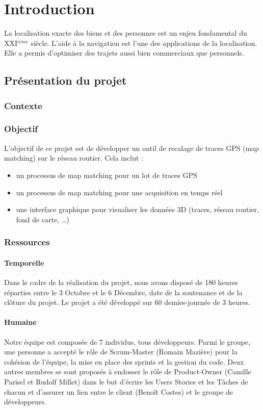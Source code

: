 \chapter{Introduction}
La localisation exacte des biens et des personnes est un enjeu fondamental du XXI$^{ieme}$ siècle. L'aide à la navigation est l'une des applications de la localisation. Elle a permis d'optimiser des trajets aussi bien commerciaux que personnels.
\section{Présentation du projet}
\subsection{Contexte}

\subsection{Objectif}
L'objectif de ce projet est de développer un outil de recalage de traces GPS (map matching) sur le réseau routier. Cela inclut :
\begin{itemize}
\item{} un processus de map matching pour un lot de traces GPS
\item{} un processus de map matching pour une acquisition en temps réel
\item{} une interface graphique pour visualiser les données 3D (traces, réseau routier, fond de carte, \dots)
\end{itemize}
\subsection{Ressources}
\subsubsection{Temporelle}
Dans le cadre de la réalisation du projet, nous avons disposé de 180 heures réparties entre le 3 Octobre et le 6 Décembre, date de la soutenance et de la clôture du projet. Le projet a été développé sur 60 demies-journée de 3 heures.
\subsubsection{Humaine}
Notre équipe est composée de 7 individus, tous développeurs. Parmi le groupe, une personne a accepté le rôle de Scrum-Master (Romain Mazière) pour la cohésion de l'équipe, la mise en place des sprints et la gestion du code. Deux autres membres se sont proposés à endosser le rôle de Product-Owner (Camille Parisel et Rudolf Millet) dans le but d'écrire les Users Stories et les Tâches de chacun et d'assurer un lien entre le client (Benoît Costes) et le groupe de développeurs.
